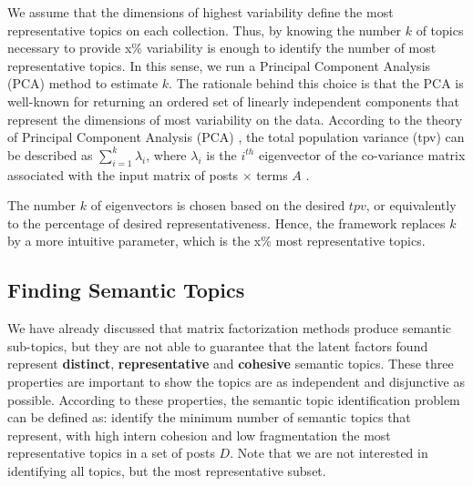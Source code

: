 We assume that the dimensions of highest variability define the most representative topics on each collection.
Thus, by knowing the number $k$ of topics necessary to provide x\% variability is enough to identify the number of most representative topics. In this sense, we run a Principal Component Analysis (PCA) method 
to estimate $k$. The rationale behind this choice is that the PCA is well-known for returning an ordered set of linearly
independent components that represent the dimensions of most variability on the data. According to the theory of Principal Component Analysis (PCA) \cite{johnson2002applied}, the total population variance (tpv) can be described as $\sum_{i=1}^{k} \lambda_{i}$, 
where $\lambda_{i}$ is the $i^{th}$ eigenvector of the co-variance matrix associated with the input matrix of posts $\times$ terms $A$ \cite{johnson2002applied}. 

The number $k$ of eigenvectors is chosen based on the desired $tpv$, or
equivalently to the percentage of desired representativeness. Hence, the framework replaces $k$ by a more intuitive parameter, which is the x\% most representative topics. 


\subsection{Finding Semantic Topics}
\label{sec:merge}

We have already discussed that matrix factorization methods produce semantic
sub-topics, but they are not able to guarantee that the latent factors found
represent \textbf{distinct}, \textbf{representative} and \textbf{cohesive}
semantic topics. These three properties are important to show the topics are
as independent and disjunctive as possible.  According to these properties,
the semantic topic identification problem can be defined as: identify the
minimum number of semantic topics that represent, with high intern cohesion
and low fragmentation the most representative topics in a set of posts $D$.
Note that we are not interested in identifying all topics, but the most
representative subset.

